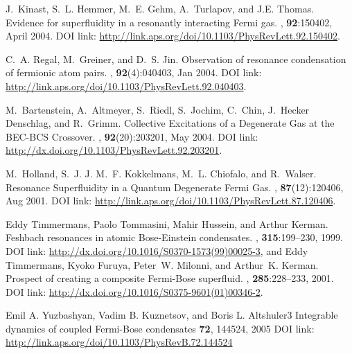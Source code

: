 \documentclass[a4paper,10pt]{article}
\begin{document}
\begin{thebibliography}{10}
J.~Kinast, S.~L. Hemmer, M.~E. Gehm, A.~Turlapov, and J.E. Thomas.
\newblock Evidence for superfluidity in a resonantly interacting {F}ermi gas.
, \textbf{92}:150402, April 2004.
\newblock DOI link: \url{http://link.aps.org/doi/10.1103/PhysRevLett.92.150402}.

C.~A. Regal, M.~Greiner, and D.~S. Jin.
\newblock Observation of resonance condensation of fermionic atom pairs.
, \textbf{92}(4):040403, Jan 2004.
\newblock DOI link: \url{http://link.aps.org/doi/10.1103/PhysRevLett.92.040403}.


M.~Bartenstein, A.~Altmeyer, S.~Riedl, S.~Jochim, C.~Chin, J.~Hecker Denschlag,
  and R.~Grimm.
\newblock Collective {E}xcitations of a {D}egenerate {G}as at the {BEC}-{BCS}
  {C}rossover.
, \textbf{92}(20):203201, May 2004.
\newblock DOI link: \url{http://dx.doi.org/10.1103/PhysRevLett.92.203201}.

M.~Holland, S.~J. J. M.~F. Kokkelmans, M.~L. Chiofalo, and R.~Walser.
\newblock Resonance {S}uperfluidity in a {Q}uantum {D}egenerate {F}ermi {G}as.
, \textbf{87}(12):120406, Aug 2001.
\newblock DOI link: \url{http://link.aps.org/doi/10.1103/PhysRevLett.87.120406}.

Eddy Timmermans, Paolo Tommasini, Mahir Hussein, and Arthur Kerman.
\newblock Feshbach resonances in atomic {B}ose-{E}instein condensates.
, \textbf{315}:199--230, 1999.
\newblock DOI link: \url{http://dx.doi.org/10.1016/S0370-1573(99)00025-3}, and
\newblock Eddy Timmermans, Kyoko Furuya, Peter~W. Milonni, and Arthur~K. Kerman.
\newblock Prospect of creating a composite {F}ermi-{B}ose superfluid.
, \textbf{285}:228--233, 2001.
\newblock DOI link: \url{http://dx.doi.org/10.1016/S0375-9601(01)00346-2}.

Emil A. Yuzbashyan, Vadim B. Kuznetsov, and Boris L. Altshuler3 
\newblock Integrable dynamics of coupled Fermi-Bose condensates
 \textbf{72}, 144524, 2005
\newblock DOI link: \url{http://link.aps.org/doi/10.1103/PhysRevB.72.144524}


\end{thebibliography}
\end{document}

